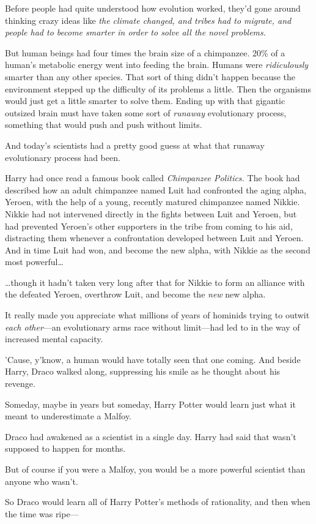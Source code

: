 Before people had quite understood how evolution worked, they'd gone around 
thinking crazy ideas like \emph{the climate changed, and tribes had to migrate, 
and people had to become smarter in order to solve all the novel problems.}

But human beings had four times the brain size of a chimpanzee. 20\% of a 
human's metabolic energy went into feeding the brain. Humans were 
\emph{ridiculously} smarter than any other species. That sort of thing didn't 
happen because the environment stepped up the difficulty of its problems a 
little. Then the organisms would just get a little smarter to solve them. 
Ending up with that gigantic outsized brain must have taken some sort of 
\emph{runaway} evolutionary process, something that would push and push without 
limits.

And today's scientists had a pretty good guess at what that runaway 
evolutionary process had been.

Harry had once read a famous book called \emph{Chimpanzee Politics.} The book 
had described how an adult chimpanzee named Luit had confronted the aging 
alpha, Yeroen, with the help of a young, recently matured chimpanzee named 
Nikkie. Nikkie had not intervened directly in the fights between Luit and 
Yeroen, but had prevented Yeroen's other supporters in the tribe from coming to 
his aid, distracting them whenever a confrontation developed between Luit and 
Yeroen. And in time Luit had won, and become the new alpha, with Nikkie as the 
second most powerful{\ldots}

{\ldots}though it hadn't taken very long after that for Nikkie to form an 
alliance with the defeated Yeroen, overthrow Luit, and become the \emph{new} 
new alpha.

It really made you appreciate what millions of years of hominids trying to 
outwit \emph{each other}---an evolutionary arms race without limit---had led to 
in the way of increased mental capacity.

'Cause, y'know, a human would have totally seen that one coming.
\sbreak
And beside Harry, Draco walked along, suppressing his smile as he thought about 
his revenge.

Someday, maybe in years but someday, Harry Potter would learn just what it 
meant to underestimate a Malfoy.

Draco had awakened as a scientist in a single day. Harry had said that wasn't 
supposed to happen for months.

But of course if you were a Malfoy, you would be a more powerful scientist than 
anyone who wasn't.

So Draco would learn all of Harry Potter's methods of rationality, and then 
when the time was ripe---
